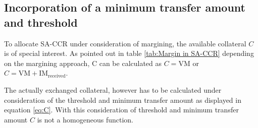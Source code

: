 \documentclass[../Thesis_AHoecherl.tex]{subfiles}
\begin{document}
    
    

    \subsection{Incorporation of a minimum transfer amount and threshold}\label{sec:Incorporation of a minimum transfer amount and threshold}

    To allocate \gls{SA-CCR} under consideration of margining, the available collateral $C$ is of special interest. As pointed out in table \ref{tab:Margin in SA-CCR} depending on the margining approach, C can be calculated as $C = \text{VM}$ or $C = \text{VM} + \text{IM}_{\text{received}}$.
    
    The actually exchanged collateral, however has to be calculated under consideration of the threshold and minimum transfer amount as displayed in equation \ref{eq:C}. With this consideration of threshold and minimum transfer amount $C$ is not a homogeneous function. 
\end{document}
